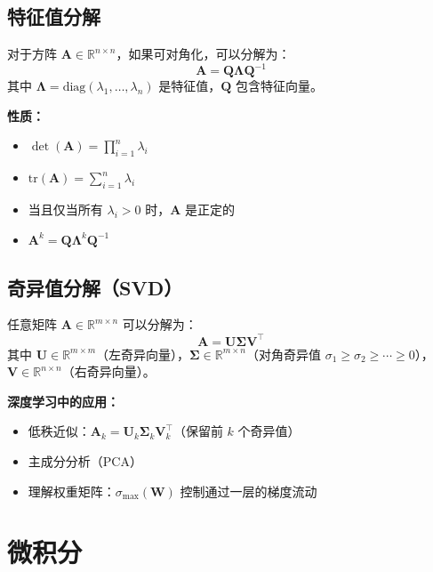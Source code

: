 \subsection{特征值分解}

对于方阵 $\mathbf{A} \in \mathbb{R}^{n \times n}$，如果可对角化，可以分解为：
\begin{equation}
\mathbf{A} = \mathbf{Q}\boldsymbol{\Lambda}\mathbf{Q}^{-1}
\end{equation}
其中 $\boldsymbol{\Lambda} = \text{diag}(\lambda_1, \ldots, \lambda_n)$ 是特征值，$\mathbf{Q}$ 包含特征向量。

\textbf{性质：}
\begin{itemize}
    \item $\det(\mathbf{A}) = \prod_{i=1}^{n} \lambda_i$
    \item $\text{tr}(\mathbf{A}) = \sum_{i=1}^{n} \lambda_i$
    \item 当且仅当所有 $\lambda_i > 0$ 时，$\mathbf{A}$ 是正定的
    \item $\mathbf{A}^k = \mathbf{Q}\boldsymbol{\Lambda}^k\mathbf{Q}^{-1}$
\end{itemize}

\subsection{奇异值分解（SVD）}

任意矩阵 $\mathbf{A} \in \mathbb{R}^{m \times n}$ 可以分解为：
\begin{equation}
\mathbf{A} = \mathbf{U}\boldsymbol{\Sigma}\mathbf{V}^\top
\end{equation}
其中 $\mathbf{U} \in \mathbb{R}^{m \times m}$（左奇异向量），$\boldsymbol{\Sigma} \in \mathbb{R}^{m \times n}$（对角奇异值 $\sigma_1 \geq \sigma_2 \geq \cdots \geq 0$），$\mathbf{V} \in \mathbb{R}^{n \times n}$（右奇异向量）。

\textbf{深度学习中的应用：}
\begin{itemize}
    \item 低秩近似：$\mathbf{A}_k = \mathbf{U}_k \boldsymbol{\Sigma}_k \mathbf{V}_k^\top$（保留前 $k$ 个奇异值）
    \item 主成分分析（PCA）
    \item 理解权重矩阵：$\sigma_{\max}(\mathbf{W})$ 控制通过一层的梯度流动
\end{itemize}

\section{微积分}

